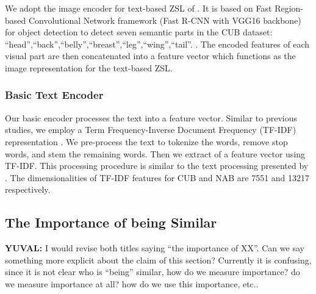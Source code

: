 \documentclass[11pt,a4paper]{article}
\newcommand\yuval[1]{\textcolor{darkpink}{\textbf{YUVAL:} #1 }}
\begin{document}
We adopt the image encoder for text-based ZSL of \citet{zhang2016spda, zhu2018generative,elhoseiny2017link}. It is based on Fast Region-based Convolutional Network framework (Fast R-CNN with VGG16 backbone) for object detection \citep{girshick2015fast} to detect seven semantic parts in the CUB dataset:
\enquote{head},\enquote{back},\enquote{belly},\enquote{breast},\enquote{leg},\enquote{wing},\enquote{tail}. 
. The encoded features of each visual part are then concatenated into a feature vector which functions as the image representation for the text-based ZSL.




\subsubsection{Basic Text Encoder}
\label{section:Text_Encoder}
Our basic encoder processes the text into a feature vector. Similar to previous studies, we employ a Term Frequency-Inverse Document Frequency (TF-IDF)  representation \citep{salton1988term}. %
We pre-process the text to tokenize the words, remove stop words, and stem the remaining words. Then we extract of a feature vector using TF-IDF. This processing procedure is similar to the text processing presented by \citet{zhu2018generative}.
The dimensionalities of TF-IDF features for CUB and NAB are 7551 and 13217 respectively. 


\subsection{The Importance of being Similar}
\yuval{I would revise both titles saying ``the importance of XX''. Can we say something more explicit about the claim of this section? Currently it is confusing, since it is not clear who is ``being'' similar, how do we measure importance? do we measure importance at all? how do we use this importance, etc.. }
\end{document}
